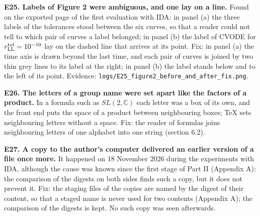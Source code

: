 \documentclass[
  10pt,
]{article}
\begin{document}
\textbf{E25. Labels of Figure 2 were ambiguous, and one lay on a line.}
Found on the exported page of the first evaluation with IDA: in panel
(a) the three labels of the tolerances stood between the six curves, so
that a reader could not tell to which pair of curves a label belonged;
in panel (b) the label of CVODE for \(r^{\rm tol}_{\rm LL}=10^{-10}\)
lay on the dashed line that arrives at its point. Fix: in panel (a) the
time axis is drawn beyond the last time, and each pair of curves is
joined by two thin grey lines to its label at the right; in panel (b)
the label stands below and to the left of its point. Evidence:
\texttt{logs/E25\_figure2\_before\_and\_after\_fix.png}.

\textbf{E26. The letters of a group name were set apart like the factors
of a product.} In a formula such as \(SL(2,\mathbb C)\) each letter was
a box of its own, and the front end puts the space of a product between
neighbouring boxes; TeX sets neighbouring letters without a space. Fix:
the reader of formulas joins neighbouring letters of one alphabet into
one string (section 6.2).

\textbf{E27. A copy to the author's computer delivered an earlier
version of a file once more.} It happened on 18 November 2026 during the
experiments with IDA, although the cause was known since the first stage
of Part II (Appendix A): the comparison of the digests on both sides
finds such a copy, but it does not prevent it. Fix: the staging files of
the copies are named by the digest of their content, so that a staged
name is never used for two contents (Appendix A); the comparison of the
digests is kept. No such copy was seen afterwards.
\end{document}
